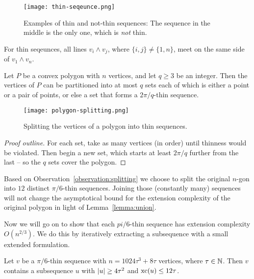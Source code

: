 \begin{figure}[h]
  \texttt{[image: thin-seqeunce.png]}
  \caption{Examples of thin and not-thin sequences: The sequence in the middle is the only one, which is \emph{not} thin.}
  \label{fig:thin-sequence}
\end{figure}

For thin seqeunces, all lines $v_i \wedge v_j$, where $\{i,j\} \neq \{1,n\}$, meet on the same side of $v_1 \wedge v_n$.

\begin{observation}\label{observation:splitting}
  Let $P$ be a convex polygon with $n$ vertices, and let $q \geq 3$ be an integer. Then the vertices of $P$ can be partitioned into at most $q$ sets each of which is either a point or a pair of points, or else a set that forms a $2\pi/q$-thin sequence.
\end{observation}

\begin{figure}[h]
  \centering
  \texttt{[image: polygon-splitting.png]}
  \caption{Splitting the vertices of a polygon into thin sequences. \cite[Figure 4]{shitov2020sublinear}}
  \label{fig:polygon-splitting}
\end{figure}

\begin{proof}[Proof outline]
  For each set, take as many vertices (in order) until thinness would be violated. Then begin a new set, which starts at least $2\pi/q$ further from the last -- so the $q$ sets cover the polygon.
\end{proof}

Based on Observation~\ref{observation:splitting} we choose to split the original $n$-gon into $12$ distinct $\pi/6$-thin sequences. Joining those (constantly many) sequences will not change the asymptotical bound for the extension complexity of the original polygon in light of Lemma~\ref{lemma:union}.

Now we will go on to show that each $pi/6$-thin sequence has extension complexity $O(n^{2/3})$. We do this by iteratively extracting a subsequence with a small extended formulation.

\begin{theorem}\label{theorem:subsequence}
  Let $v$ be a $\pi/6$-thin sequence with $n = 1024\tau^3 + 8\tau$ vertices, where $\tau \in \mathbb{N}$. 
  Then $v$ contains a subsequence $u$ with $\lvert u\rvert \geq 4\tau^2$ and $\operatorname{xc}(u) \leq 12\tau$.
\end{theorem}

